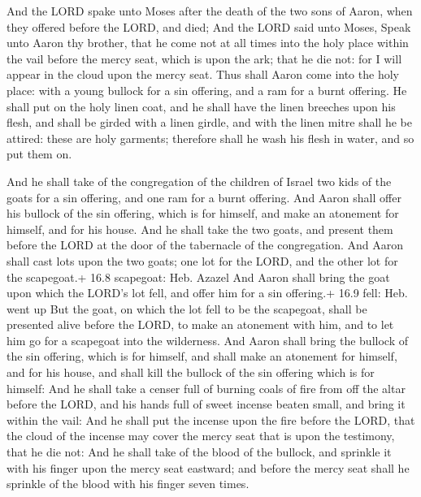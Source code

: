  And the LORD spake unto Moses after the death of the two
sons of Aaron, when they offered before the LORD, and died; 
And the LORD said unto Moses, Speak unto Aaron thy brother, that he come
not at all times into the holy place within the vail before the mercy
seat, which is upon the ark; that he die not: for I will appear in the
cloud upon the mercy seat.  Thus shall Aaron come into the
holy place: with a young bullock for a sin offering, and a ram for a
burnt offering.  He shall put on the holy linen coat, and he
shall have the linen breeches upon his flesh, and shall be girded with a
linen girdle, and with the linen mitre shall he be attired: these are
holy garments; therefore shall he wash his flesh in water, and so put
them on.

 And he shall take of the congregation of the children of
Israel two kids of the goats for a sin offering, and one ram for a burnt
offering.  And Aaron shall offer his bullock of the sin
offering, which is for himself, and make an atonement for himself, and
for his house.  And he shall take the two goats, and present
them before the LORD at the door of the tabernacle of the congregation.
 And Aaron shall cast lots upon the two goats; one lot for
the LORD, and the other lot for the scapegoat.+ 16.8 scapegoat: Heb.
Azazel  And Aaron shall bring the goat upon which the LORD's
lot fell, and offer him for a sin offering.+ 16.9 fell: Heb. went up
 But the goat, on which the lot fell to be the scapegoat,
shall be presented alive before the LORD, to make an atonement with him,
and to let him go for a scapegoat into the wilderness.  And
Aaron shall bring the bullock of the sin offering, which is for himself,
and shall make an atonement for himself, and for his house, and shall
kill the bullock of the sin offering which is for himself: 
And he shall take a censer full of burning coals of fire from off the
altar before the LORD, and his hands full of sweet incense beaten small,
and bring it within the vail:  And he shall put the incense
upon the fire before the LORD, that the cloud of the incense may cover
the mercy seat that is upon the testimony, that he die not:
 And he shall take of the blood of the bullock, and
sprinkle it with his finger upon the mercy seat eastward; and before the
mercy seat shall he sprinkle of the blood with his finger seven times.

